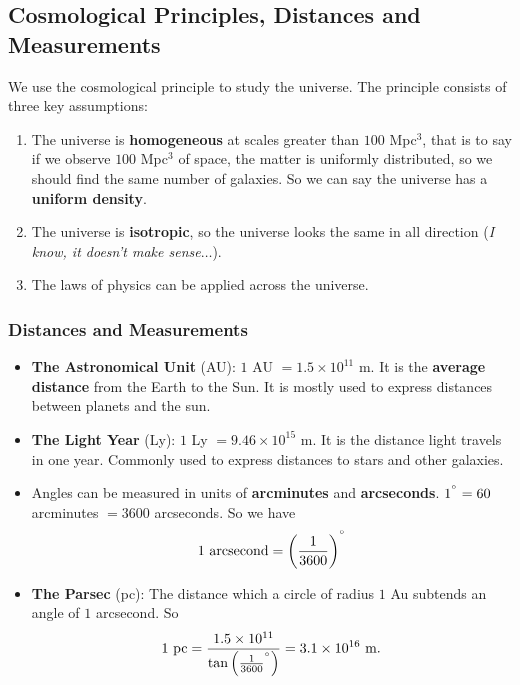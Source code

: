 \subsection{Cosmological Principles, Distances and Measurements}

We use the cosmological principle to study the universe. The principle consists of three key assumptions:
\begin{enumerate}
    \item The universe is \textbf{homogeneous} at scales greater than $100 $ Mpc$^3$, that is to say if we observe $100 $ Mpc$^3$ of space, the matter is uniformly distributed, so we should find the same number of galaxies. So we can say the universe has a \textbf{uniform density}.
    \item The universe is \textbf{isotropic}, so the universe looks the same in all direction (\textit{I know, it doesn't make sense$\ldots$}).
    \item The laws of physics can be applied across the universe. 
\end{enumerate}

\subsubsection{Distances and Measurements}

\begin{itemize}
    \item \textbf{The Astronomical Unit} (AU): $1 $ AU $= 1.5 \times 10^{11}$ m. It is the \textbf{average distance} from the Earth to the Sun. It is mostly used to express distances between planets and the sun.
    \item \textbf{The Light Year} (Ly): $1 $ Ly $= 9.46 \times 10^{15}$ m. It is the distance light travels in one year. Commonly used to express distances to stars and other galaxies.
    \item Angles can be measured in units of \textbf{arcminutes} and \textbf{arcseconds}. $1^{\degree} = 60$ arcminutes $= 3600$ arcseconds. So we have
    \begin{equation}
        1 \text{ arcsecond} = \left(\frac{1}{3600}\right)^{\degree}
    \end{equation}
    \item \textbf{The Parsec} (pc): The distance which a circle of radius $1$ Au subtends an angle of $1$ arcsecond. So 
    \begin{equation}
        1 \text{ pc} = \frac{1.5 \times 10^{11}}{ \tan \left(\frac{1}{3600}^{\degree}\right)} = 3.1 \times 10^{16} \text{ m}.
    \end{equation}
\end{itemize}

